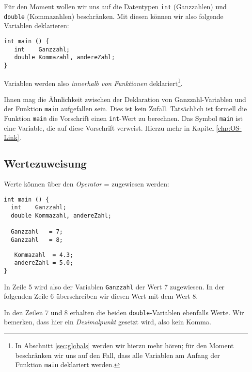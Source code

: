 Für den Moment wollen wir uns auf die Datentypen \texttt{int} (Ganzzahlen) und \texttt{double} (Kommazahlen) beschränken. Mit diesen können wir also folgende Variablen deklarieren:
\begin{codebox}
\begin{verbatim}
int main () {
   int    Ganzzahl;
   double Kommazahl, andereZahl;
}
\end{verbatim}
\end{codebox}
Variablen werden also \emph{innerhalb von Funktionen} deklariert\footnote{In Abschnitt \ref{sec:globals} werden wir hierzu mehr hören; für den Moment beschränken wir uns auf den Fall, dass alle Variablen am Anfang der Funktion \texttt{main} deklariert werden.}.

Ihnen mag die Ähnlichkeit zwischen der Deklaration von Ganzzahl-Variablen und der Funktion \texttt{main} aufgefallen sein. Dies ist kein Zufall. Tatsächlich ist formell die Funktion \texttt{main} die Vorschrift einen \texttt{int}-Wert zu berechnen. Das Symbol \texttt{main} ist eine Variable, die auf diese Vorschrift verweist. Hierzu mehr in Kapitel \ref{chp:OS-Link}.

\subsection{Wertezuweisung} \label{sec:valueAssignment}
Werte können über den \emph{Operator} = zugewiesen werden:
\begin{codebox}
\begin{verbatim}
int main () {
  int    Ganzzahl;
  double Kommazahl, andereZahl;
  
  Ganzzahl   = 7;
  Ganzzahl   = 8;
\end{verbatim}
\end{codebox}

\begin{codebox}[]
\begin{verbatim}
   Kommazahl  = 4.3;
   andereZahl = 5.0;
}
\end{verbatim}
\end{codebox}

In Zeile 5 wird also der Variablen \texttt{Ganzzahl} der Wert 7 zugewiesen. In der folgenden Zeile 6 überschreiben wir diesen Wert mit dem Wert 8.

In den Zeilen 7 und 8 erhalten die beiden \texttt{double}-Variablen ebenfalls Werte. Wir bemerken, dass hier ein \emph{Dezimalpunkt} gesetzt wird, also kein Komma.

